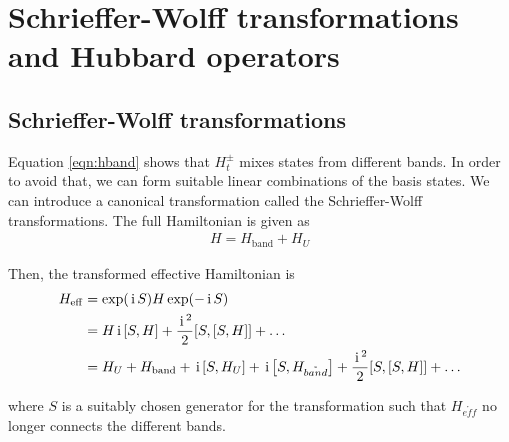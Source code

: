 \documentclass[]{report}
\newcommand{\I}{\,\mathrm{i}\,}
\begin{document}
\chapter{Schrieffer-Wolff transformations and Hubbard operators}
\section{Schrieffer-Wolff transformations}
Equation \eqref{eqn:hband} shows that $ H^{\pm}_{t} $ mixes states from different bands. In order to avoid that, we can form suitable linear combinations of the basis states. We can introduce a canonical transformation called the Schrieffer-Wolff transformations. The full Hamiltonian is given as
\begin{align}
H = H_{\mathrm{band}} + H_U
\end{align}

Then, the transformed effective Hamiltonian is
\begin{align}
\nonumber
H_{\mathrm{eff}} &= \exp(\I S) H \exp(-\I S)\\
\nonumber
&= H \I \comm{S}{H} + \frac{\I^2}{2} \comm{S}{\comm{S}{H}} + \dots\\
&= H_U + H_{\mathrm{band}} + \I \comm{S}{H_U} + \I \comm{S}{H_{\mathring{band}}} + \frac{\I^2}{2} \comm{S}{\comm{S}{H}} + \dots
\end{align}

where $ S $ is a suitably chosen generator for the transformation such that $ H_{\mathring{eff}} $ no longer connects the different bands.
\end{document}
